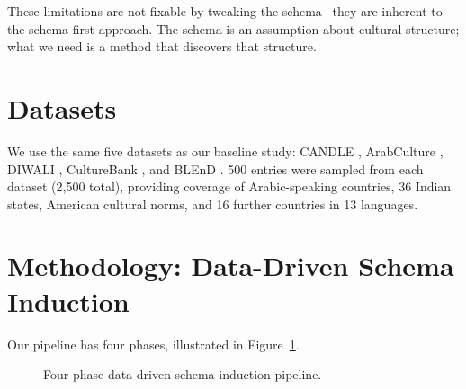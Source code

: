 \documentclass[11pt]{article}
\begin{document}
These limitations are not fixable by tweaking the schema --they are
inherent to the schema-first approach. The schema is an assumption about
cultural structure; what we need is a method that discovers that structure.

\section{Datasets}
\label{sec:datasets}

We use the same five datasets as our baseline study:
CANDLE \cite{nguyen2023candle},
ArabCulture \cite{sadallah2025arab},
DIWALI \cite{sahoo2025diwali},
CultureBank \cite{shi2024culturebank}, and
BLEnD \cite{myung2024blend}.
500 entries were sampled from each dataset (2,500 total),
providing coverage of Arabic-speaking countries, 36 Indian states,
American cultural norms, and 16 further countries in 13 languages.

\section{Methodology: Data-Driven Schema Induction}
\label{sec:methodology}

Our pipeline has four phases, illustrated in Figure~\ref{fig:pipeline}.

\begin{figure}[h]
\centering
\small
{}
\caption{Four-phase data-driven schema induction pipeline.}
\label{fig:pipeline}
\end{figure}
\end{document}
